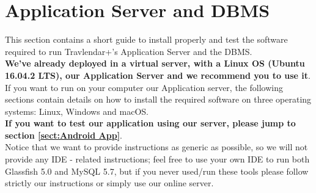 \section{Application Server and DBMS}
\label{sect:Application Server and DBMS}
This section contains a short guide to install properly and test the software required to run Travlendar+'s Application Server and the DBMS.\\
{\large \textbf{We've already deployed in a virtual server, with a Linux OS (Ubuntu 16.04.2 LTS), our Application Server and we recommend you to use it}}.\\
If you want to run on your computer our Application server, the following sections contain details on how to install the required software on three operating systems: Linux, Windows and macOS.\\
{\large \textbf{If you want to test our application using our server, please jump to section  \ref{sect:Android App}}}.\\
Notice that we want to provide instructions as generic as possible, so we will not provide any IDE - related instructions; feel free to use your own IDE to run both Glassfish 5.0 and MySQL 5.7, but if you never used/run these tools please follow strictly our instructions or simply use our online server.
